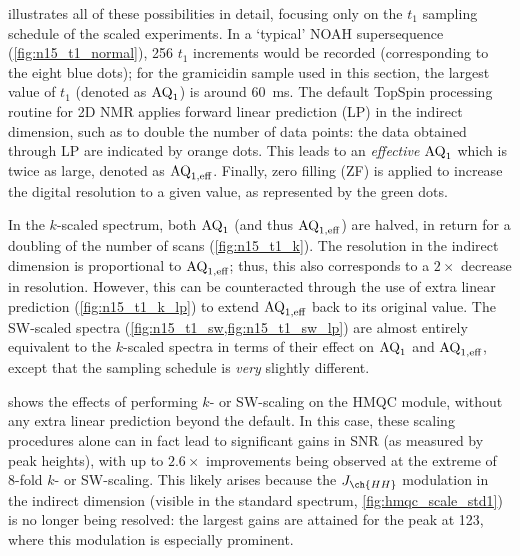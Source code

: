  illustrates all of these possibilities in detail, focusing only on the $t_1$ sampling schedule of the scaled \nitrogen{} experiments.
In a `typical' NOAH supersequence (\cref{fig:n15_t1_normal}), 256 $t_1$ increments would be recorded (corresponding to the eight blue dots);
for the gramicidin sample used in this section, the largest value of $t_1$ (denoted as $\text{AQ}_1$) is around \qty{60}{\ms}.
The default TopSpin processing routine for 2D NMR applies forward linear prediction (LP)\autocite{Ni1986JMR,Tirendi1989JMR,Led1991CR,Koehl1999PNMRS} in the indirect dimension, such as to double the number of data points: the data obtained through LP are indicated by orange dots.
This leads to an \textit{effective} $\text{AQ}_1$ which is twice as large, denoted as $\text{AQ}_{1,\text{eff}}$.
Finally, zero filling (ZF) is applied to increase the digital resolution to a given value, as represented by the green dots.

In the $k$-scaled spectrum, both $\text{AQ}_1$ (and thus $\text{AQ}_{1,\text{eff}}$) are halved, in return for a doubling of the number of scans (\cref{fig:n15_t1_k}).
The resolution in the indirect dimension is proportional to $\text{AQ}_{1,\text{eff}}$; thus, this also corresponds to a $2\times$ decrease in resolution.
However, this can be counteracted through the use of extra linear prediction (\cref{fig:n15_t1_k_lp}) to extend $\text{AQ}_{1,\text{eff}}$ back to its original value.
The SW-scaled spectra (\cref{fig:n15_t1_sw,fig:n15_t1_sw_lp}) are almost entirely equivalent to the $k$-scaled spectra in terms of their effect on $\text{AQ}_1$ and $\text{AQ}_{1,\text{eff}}$, except that the sampling schedule is \textit{very} slightly different.

 shows the effects of performing $k$- or SW-scaling on the \nitrogen{} HMQC module, without any extra linear prediction beyond the default.
In this case, these scaling procedures alone can in fact lead to significant gains in SNR (as measured by peak heights), with up to $2.6\times$ improvements being observed at the extreme of 8-fold $k$- or SW-scaling.
This likely arises because the $J_{\ch{HH}}$ modulation in the indirect dimension (visible in the standard spectrum, \cref{fig:hmqc_scale_std1}) is no longer being resolved: the largest gains are attained for the peak at \qty{123}{\ppm}, where this modulation is especially prominent.

